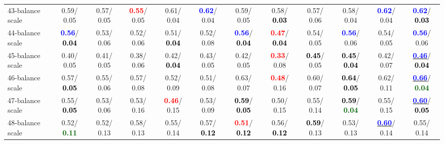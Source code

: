 \begin{table}[h]
\begin{center}
{\begin{tabular}{lc|c|c|c|c|c|c|c|c|c|c}
43-balance scale &   0.59/  0.05 &   0.57/  0.05 & \textcolor{red}{\textbf{  0.55}}/  0.05 &   0.61/  0.04 & \textcolor{blue}{\textbf{  0.62}}/  0.04 &   0.59/  0.05 &   0.58/\textcolor{black}{\textbf{  0.03}} &   0.57/  0.06 &   0.58/  0.04 & \textcolor{blue}{\textbf{  0.62}}/  0.04 & \textcolor{blue}{\textbf{  0.62}}/\textcolor{black}{\textbf{  0.03}} \\
44-balance scale & \textcolor{blue}{\textbf{  0.56}}/\textcolor{black}{\textbf{  0.04}} &   0.53/  0.06 &   0.52/  0.06 &   0.51/\textcolor{black}{\textbf{  0.04}} &   0.52/  0.08 & \textcolor{blue}{\textbf{  0.56}}/\textcolor{black}{\textbf{  0.04}} & \textcolor{red}{\textbf{  0.47}}/\textcolor{black}{\textbf{  0.04}} &   0.54/  0.05 & \textcolor{blue}{\textbf{  0.56}}/  0.06 &   0.54/  0.05 & \textcolor{blue}{\textbf{  0.56}}/  0.06 \\
45-balance scale &   0.40/  0.05 &   0.41/  0.05 &   0.38/  0.06 &   0.42/\textcolor{black}{\textbf{  0.04}} &   0.43/  0.05 &   0.42/  0.05 & \textcolor{red}{\textbf{  0.33}}/  0.08 & \textcolor{black}{\textbf{  0.45}}/  0.05 & \textcolor{black}{\textbf{  0.45}}/\textcolor{black}{\textbf{  0.04}} &   0.42/  0.07 & \underline{\textcolor{blue}{\textbf{  0.46}}}/\textcolor{black}{\textbf{  0.04}} \\
46-balance scale &   0.57/\textcolor{black}{\textbf{  0.05}} &   0.55/  0.06 &   0.57/  0.08 &   0.52/  0.09 &   0.51/  0.08 &   0.63/  0.07 & \textcolor{red}{\textbf{  0.48}}/  0.16 &   0.60/  0.07 & \textcolor{black}{\textbf{  0.64}}/\textcolor{black}{\textbf{  0.05}} &   0.62/  0.11 & \underline{\textcolor{blue}{\textbf{  0.66}}}/\textcolor{darkgreen}{\textbf{  0.04}} \\ \hline
47-balance scale &   0.55/\textcolor{black}{\textbf{  0.05}} &   0.53/  0.06 &   0.53/  0.16 & \textcolor{red}{\textbf{  0.46}}/  0.15 &   0.53/  0.09 & \textcolor{black}{\textbf{  0.59}}/\textcolor{black}{\textbf{  0.05}} &   0.50/  0.15 &   0.55/  0.14 & \textcolor{black}{\textbf{  0.59}}/\textcolor{darkgreen}{\textbf{  0.04}} &   0.55/  0.15 & \underline{\textcolor{blue}{\textbf{  0.60}}}/\textcolor{black}{\textbf{  0.05}} \\
48-balance scale &   0.52/\textcolor{darkgreen}{\textbf{  0.11}} &   0.52/  0.13 &   0.58/  0.13 &   0.55/  0.14 &   0.57/\textcolor{black}{\textbf{  0.12}} & \textcolor{red}{\textbf{  0.51}}/\textcolor{black}{\textbf{  0.12}} &   0.56/\textcolor{black}{\textbf{  0.12}} & \textcolor{black}{\textbf{  0.59}}/  0.13 &   0.53/  0.13 & \underline{\textcolor{blue}{\textbf{  0.60}}}/  0.14 &   0.55/  0.14 \\

\end{tabular}}
\end{center}
\end{table}
